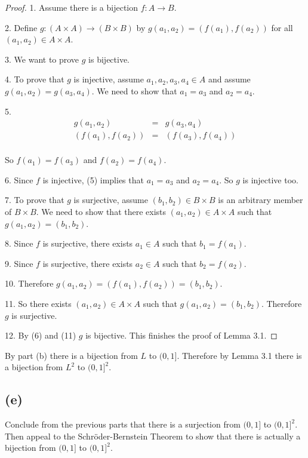 \documentclass[14pt]{extarticle}
\begin{document}
\begin{proof}
1. Assume there is a bijection $f: A \to B$.

2. Define $g: (A \times A) \to (B \times B)$ by $g(a_1, a_2) = (f(a_1), f(a_2))$ for all $(a_1, a_2) \in A \times A$.

3. We want to prove $g$ is bijective.

4. To prove that $g$ is injective, assume $a_1, a_2, a_3, a_4 \in A$ and assume $g(a_1, a_2) = g(a_3, a_4)$. We need to show that $a_1 = a_3$ and $a_2 = a_4$.

5. 
$$
\begin{array}{ccc}
g(a_1, a_2) & = & g(a_3, a_4) \\
(f(a_1), f(a_2)) & = & (f(a_3), f(a_4)) \\
\end{array}
$$

So $f(a_1) = f(a_3)$ and $f(a_2) = f(a_4)$. 

6. Since $f$ is injective, (5) implies that $a_1 = a_3$ and $a_2 = a_4$. So $g$ is injective too.

7. To prove that $g$ is surjective, assume $(b_1, b_2) \in B \times B$ is an arbitrary member of $B \times B$. We need to show that there exists $(a_1, a_2) \in A \times A$ such that $g(a_1, a_2) = (b_1, b_2)$.

8. Since $f$ is surjective, there exists $a_1 \in A$ such that $b_1 = f(a_1)$.

9. Since $f$ is surjective, there exists $a_2 \in A$ such that $b_2 = f(a_2)$.

10. Therefore $g(a_1, a_2) = (f(a_1), f(a_2)) = (b_1, b_2)$. 

11. So there exists $(a_1, a_2) \in A \times A$ such that $g(a_1, a_2) = (b_1, b_2)$. Therefore $g$ is surjective.

12. By (6) and (11) $g$ is bijective. This finishes the proof of Lemma 3.1.
\end{proof}

By part (b) there is a bijection from $L$ to $(0, 1]$. Therefore by Lemma 3.1 there is a bijection from $L^2$ to $(0, 1]^2$.

\subsection{(e)}
Conclude from the previous parts that there is a surjection from $(0, 1]$ to $(0, 1]^2$. Then appeal to the Schröder-Bernstein Theorem to show that there is actually a bijection from $(0, 1]$ to $(0, 1]^2$.
\end{document}
